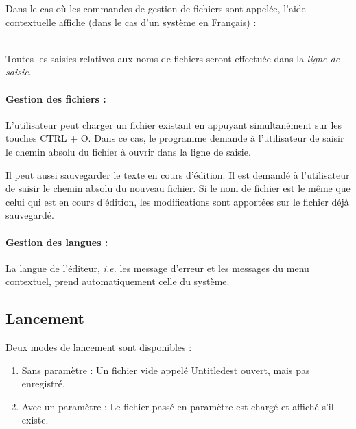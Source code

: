 Dans le cas où les commandes de gestion de fichiers sont appelée, l'aide contextuelle affiche (dans le cas d'un système en Français) :\\
\begin{center}
\end{center}
~\\
Toutes les saisies relatives aux noms de fichiers seront effectuée dans la \textsl{ligne de saisie}.

\paragraph{Gestion des fichiers :}
L'utilisateur peut charger un fichier existant en appuyant simultanément sur les touches \og CTRL + O\fg. Dans ce cas, le programme demande à l'utilisateur de saisir le chemin absolu du fichier à ouvrir dans la ligne de saisie.

Il peut aussi sauvegarder le texte en cours d'édition. Il est demandé à
l'utilisateur de saisir le chemin absolu du nouveau fichier. Si le nom de
fichier est le même que celui qui est en cours d'édition, les modifications
sont apportées sur le fichier déjà sauvegardé.

\paragraph{Gestion des langues :}
La langue de l'éditeur, \textsl{i.e.} les message d'erreur et les messages du menu contextuel, prend automatiquement celle du système.

\subsection{Lancement}
Deux modes de lancement sont disponibles :
\begin{enumerate}
	\item Sans paramètre : Un fichier vide appelé \og Untitled\fg est ouvert, mais pas enregistré.
	\item Avec un paramètre : Le fichier passé en paramètre est chargé et affiché s'il existe.
\end{enumerate}

